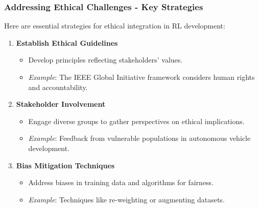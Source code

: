 \documentclass{beamer}
\begin{document}
\begin{frame}[fragile]
    \frametitle{Addressing Ethical Challenges - Key Strategies}
    Here are essential strategies for ethical integration in RL development:
    \begin{enumerate}
        \item \textbf{Establish Ethical Guidelines}
            \begin{itemize}
                \item Develop principles reflecting stakeholders' values.
                \item \textit{Example}: The IEEE Global Initiative framework considers human rights and accountability.
            \end{itemize}
        \item \textbf{Stakeholder Involvement}
            \begin{itemize}
                \item Engage diverse groups to gather perspectives on ethical implications.
                \item \textit{Example}: Feedback from vulnerable populations in autonomous vehicle development.
            \end{itemize}
        \item \textbf{Bias Mitigation Techniques}
            \begin{itemize}
                \item Address biases in training data and algorithms for fairness.
                \item \textit{Example}: Techniques like re-weighting or augmenting datasets.
            \end{itemize}
    \end{enumerate}
\end{frame}
\end{document}
